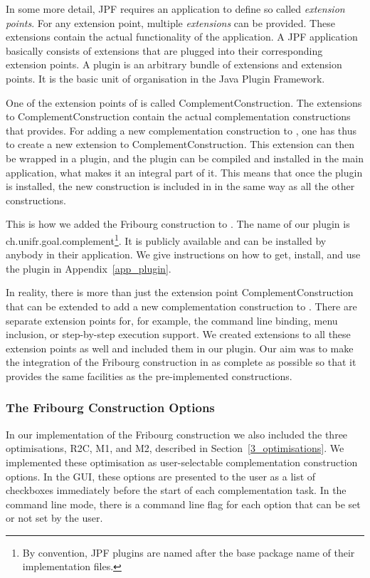 In some more detail, JPF requires an application to define so called \textit{extension points}. For any extension point, multiple \textit{extensions} can be provided. These extensions contain the actual functionality of the application. A JPF application basically consists of extensions that are plugged into their corresponding extension points. A plugin is an arbitrary bundle of extensions and extension points. It is the basic unit of organisation in the Java Plugin Framework.

One of the extension points of \goal{} is called \textsf{ComplementConstruction}. The extensions to \textsf{ComplementConstruction} contain the actual complementation constructions that \goal{} provides. For adding a new complementation construction to \goal, one has thus to create a new extension to \textsf{ComplementConstruction}. This extension can then be wrapped in a plugin, and the plugin can be compiled and installed in the main application, what makes it an integral part of it. This means that once the plugin is installed, the new construction is included in \goal{} in the same way as all the other constructions.

This is how we added the Fribourg construction to \goal. The name of our plugin is \textsf{ch.unifr.goal.complement}\footnote{By convention, JPF plugins are named after the base package name of their implementation files.}. It is publicly available and can be installed by anybody in their \goal{} application. We give instructions on how to get, install, and use the plugin in Appendix~\ref{app_plugin}.

In reality, there is more than just the extension point \textsf{ComplementConstruction} that can be extended to add a new complementation construction to \goal. There are separate extension points for, for example, the command line binding, menu inclusion, or step-by-step execution support. We created extensions to all these extension points as well and included them in our plugin. Our aim was to make the integration of the Fribourg construction in \goal{} as complete as possible so that it provides the same facilities as the pre-implemented constructions.

\subsubsection{The Fribourg Construction Options}
In our implementation of the Fribourg construction we also included the three optimisations, R2C, M1, and M2, described in Section~\ref{3_optimisations}. We implemented these optimisation as user-selectable complementation construction options. In the GUI, these options are presented to the user as a list of checkboxes immediately before the start of each complementation task. In the command line mode, there is a command line flag for each option that can be set or not set by the user.

